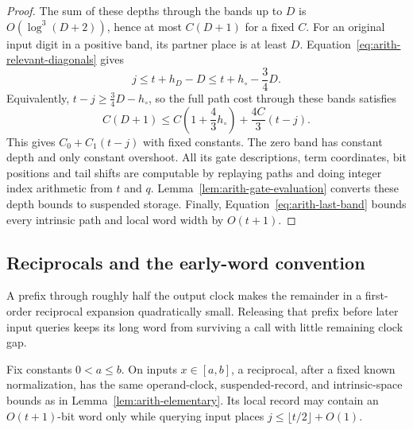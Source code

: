 \begin{proof}
The sum of these depths through the bands up to $D$ is
$O(\log^3(D+2))$, hence at most $C(D+1)$ for a fixed $C$.
For an original input digit in a positive band, its partner place
is at least $D$.  Equation~\eqref{eq:arith-relevant-diagonals} gives
\begin{equation}
 j\leq t+h_D-D
       \leq t+h_\circ-\frac34D.
 \label{eq:arith-multiplication-latency}
\end{equation}
Equivalently, $t-j\geq\tfrac34D-h_\circ$, so the full path cost
through these bands satisfies
\[
 C(D+1)\leq C\left(1+\frac43h_\circ\right)
                   +\frac{4C}{3}(t-j).
\]
This gives $C_0+C_1(t-j)$ with fixed constants.  The zero band
has constant depth and only constant overshoot.  All its gate
descriptions, term coordinates, bit positions and tail shifts are
computable by replaying paths and doing integer index arithmetic
from $t$ and $q$.  Lemma~\ref{lem:arith-gate-evaluation} converts these
depth bounds to suspended storage.  Finally,
Equation~\eqref{eq:arith-last-band} bounds every intrinsic path
and local word width by $O(t+1)$.
\end{proof}

\subsection{Reciprocals and the early-word convention}

A prefix through roughly half the output clock makes the remainder
in a first-order reciprocal expansion quadratically small. Releasing
that prefix before later input queries keeps its long word from
surviving a call with little remaining clock gap.

\begin{lemma}
\label{lem:arith-reciprocal}
Fix constants $0<a\leq b$.  On inputs $x\in[a,b]$, a reciprocal,
after a fixed known normalization, has the same operand-clock,
suspended-record, and intrinsic-space bounds as in
Lemma~\ref{lem:arith-elementary}.  Its local record may contain an
$O(t+1)$-bit word only while querying input places
$j\leq\lfloor t/2\rfloor+O(1)$.
\end{lemma}

